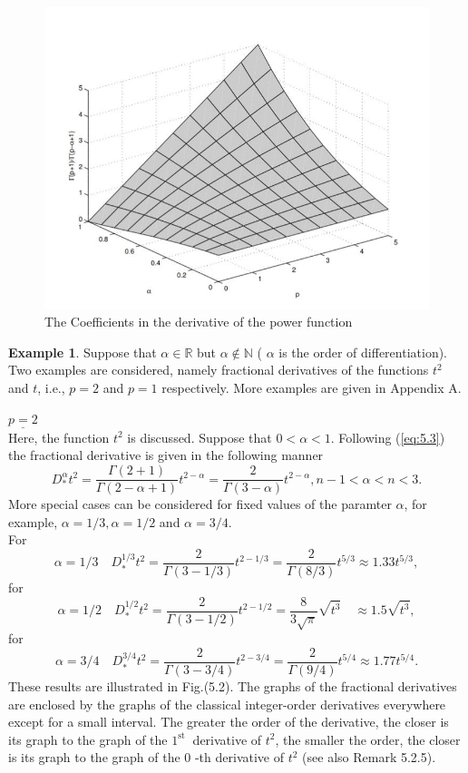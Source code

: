 \documentclass[a4paper,14pt,oneside]{book}
\theoremstyle{plain}
\theoremstyle{definition}
\newtheorem{exmp}{Example}[section]%
\theoremstyle{remark}
\begin{document}
\begin{center}
\begin{flushleft}
{\begin{figure}
    \includegraphics[scale=0.6]{The Coefficients in the derivative of the power function}
    \caption{The Coefficients in the derivative of the power function}
    \label{fig:5.1}
\end{figure}
\begin{exmp}
Suppose that $\alpha \in \mathbb{R}$ but $\alpha \notin \mathbb{N}$ ( $\alpha$ is the order of differentiation). Two examples are considered, namely fractional derivatives of the functions $t^{2}$ and $t$, i.e., $p=2$ and $p=1$ respectively. More examples are given in Appendix A.  
\end{exmp}
$\underline{p=2}$\\
Here, the function $t^{2}$ is discussed. Suppose that $0<\alpha<1$. Following (\ref{eq:5.3}) the fractional derivative is given in the following manner
$$
D_{*}^{\alpha} t^{2}=\frac{\Gamma(2+1)}{\Gamma(2-\alpha+1)} t^{2-\alpha}=\frac{2}{\Gamma(3-\alpha)} t^{2-\alpha}, n-1<\alpha<n<3 .
$$
More special cases can be considered for fixed values of the paramter $\alpha$, for example, $\alpha=1 / 3, \alpha=1 / 2$ and $\alpha=3 / 4$.\\
For $$\alpha=1 / 3 \quad D_{*}^{1 / 3} t^{2}=\frac{2}{\Gamma(3-1 / 3)} t^{2-1 / 3}=\frac{2}{\Gamma(8 / 3)} t^{5 / 3} \approx 1.33 t^{5 / 3},$$
for $$\alpha=1 / 2 \quad D_{*}^{1 / 2} t^{2}=\frac{2}{\Gamma(3-1 / 2)} t^{2-1 / 2}=\frac{8}{3 \sqrt{\pi}} \sqrt{t^{3}} \quad \approx 1.5 \sqrt{t^{3}},$$
for $$\alpha=3 / 4 \quad D_{*}^{3 / 4} t^{2}=\frac{2}{\Gamma(3-3 / 4)} t^{2-3 / 4}=\frac{2}{\Gamma(9 / 4)} t^{5 / 4} \approx 1.77 t^{5 / 4}.$$
These results are illustrated in Fig.(5.2). The graphs of the fractional derivatives are enclosed by the graphs of the classical integer-order derivatives everywhere except for a small interval. The greater the order of the derivative, the closer is its graph to the graph of the $1^{\text {st }}$ derivative of $t^{2}$, the smaller the order, the closer is its graph to the graph of the 0 -th derivative of $t^{2}$ (see also Remark 5.2.5).\\
}
\end{flushleft}
\end{center}
\end{document}
